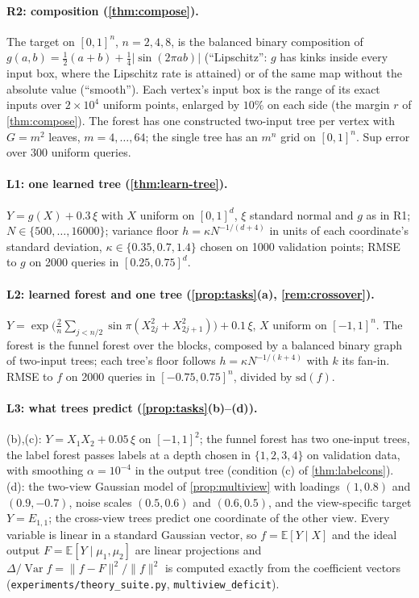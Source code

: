 \documentclass[11pt]{article}
\theoremstyle{definition}
\theoremstyle{remark}
\newcommand{\E}{\mathbb{E}}
\newcommand{\Var}{\operatorname{Var}}
\begin{document}
\paragraph{R2: composition (\cref{thm:compose}).}
The target on $[0,1]^n$, $n=2,4,8$, is the balanced binary composition of
$g(a,b)=\tfrac12(a+b)+\tfrac14|\sin(2\pi ab)|$ (``Lipschitz'': $g$ has kinks inside every
input box, where the Lipschitz rate is attained) or of the same map without the absolute
value (``smooth'').  Each vertex's input box is the range of its exact inputs over $2\times10^4$
uniform points, enlarged by $10\%$ on each side (the margin $r$ of \cref{thm:compose}).  The
forest has one constructed two-input tree per vertex with $G=m^2$ leaves, $m=4,\dots,64$;
the single tree has an $m^n$ grid on $[0,1]^n$.  Sup error over 300 uniform queries.

\paragraph{L1: one learned tree (\cref{thm:learn-tree}).}
$Y=g(X)+0.3\,\xi$ with $X$ uniform on $[0,1]^d$, $\xi$ standard normal and $g$ as in R1;
$N\in\{500,\dots,16000\}$; variance floor $h=\kappa N^{-1/(d+4)}$ in units of each
coordinate's standard deviation, $\kappa\in\{0.35,0.7,1.4\}$ chosen on 1000 validation
points; RMSE to $g$ on 2000 queries in $[0.25,0.75]^d$.

\paragraph{L2: learned forest and one tree (\cref{prop:tasks}(a), \cref{rem:crossover}).}
$Y=\exp\bigl(\tfrac2n\sum_{j<n/2}\sin\pi(X_{2j}^2+X_{2j+1}^2)\bigr)+0.1\,\xi$, $X$ uniform on
$[-1,1]^n$.  The forest is the funnel forest over the blocks, composed by a balanced binary
graph of two-input trees; each tree's floor follows $h=\kappa N^{-1/(k+4)}$ with $k$ its
fan-in.  RMSE to $f$ on 2000 queries in $[-0.75,0.75]^n$, divided by $\mathrm{sd}(f)$.

\paragraph{L3: what trees predict (\cref{prop:tasks}(b)--(d)).}
(b),(c): $Y=X_1X_2+0.05\,\xi$ on $[-1,1]^2$; the funnel forest has two one-input trees, the
label forest passes labels at a depth chosen in $\{1,2,3,4\}$ on validation data, with
smoothing $\alpha=10^{-4}$ in the output tree (condition (c) of \cref{thm:labelcons}).  (d): the
two-view Gaussian model of \cref{prop:multiview} with loadings $(1,0.8)$ and $(0.9,-0.7)$,
noise scales $(0.5,0.6)$ and $(0.6,0.5)$, and the view-specific target $Y=E_{1,1}$; the
cross-view trees predict one coordinate of the other view.  Every variable is linear in a
standard Gaussian vector, so $f=\E[Y\mid X]$ and the ideal output $F=\E[Y\mid\mu_1,\mu_2]$
are linear projections and $\Delta/\Var f=\|f-F\|^2/\|f\|^2$ is computed exactly from the
coefficient vectors (\texttt{experiments/theory\_suite.py}, \texttt{multiview\_deficit}).
\end{document}
